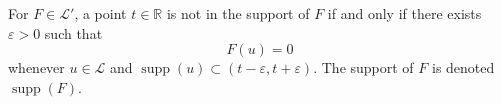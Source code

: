 For $F \in \mathcal{L}'$, a point $t \in \mathbb{R}$ is not in the support of $F$ if and only if there exists $\varepsilon > 0$ such that
$$F(u) = 0$$
whenever $u \in \mathcal{L}$ and $\operatorname{supp}(u) \subset (t - \varepsilon, t + \varepsilon)$. The support of $F$ is denoted $\operatorname{supp}(F)$.
